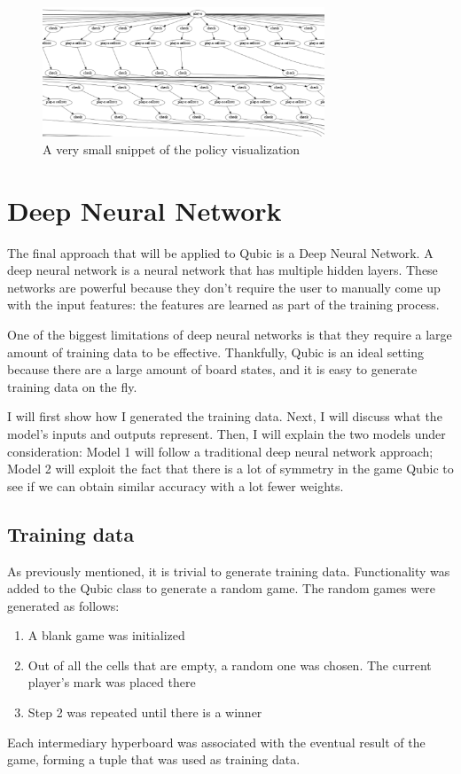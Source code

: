 \documentclass[11pt]{article}
\begin{document}
\begin{figure}[h]
    \centering
    \includegraphics[width=0.75\textwidth]{policyviz}
    \caption{A very small snippet of the policy visualization}
    \label{fig:policyviz}
\end{figure}

\section{Deep Neural Network}
The final approach that will be applied to Qubic is a Deep Neural Network. A deep neural network is a neural network that has multiple hidden layers. These networks are powerful because they don't require the user to manually come up with the input features: the features are learned as part of the training process.

One of the biggest limitations of deep neural networks is that they require a large amount of training data to be effective. Thankfully, Qubic is an ideal setting because there are a large amount of board states, and it is easy to generate training data on the fly. 

I will first show how I generated the training data. Next, I will discuss what the model's inputs and outputs represent. Then, I will explain the two models under consideration: Model 1 will follow a traditional deep neural network approach; Model 2 will exploit the fact that there is a lot of symmetry in the game Qubic to see if we can obtain similar accuracy with a lot fewer weights.

\subsection{Training data}
As previously mentioned, it is trivial to generate training data. Functionality was added to the Qubic class to generate a random game. The random games were generated as follows:
\begin{enumerate}
    \item A blank game was initialized
    \item Out of all the cells that are empty, a random one was chosen. The current player's mark was placed there
    \item Step 2 was repeated until there is a winner
\end{enumerate}
Each intermediary hyperboard was associated with the eventual result of the game, forming a tuple that was used as training data.
\end{document}
